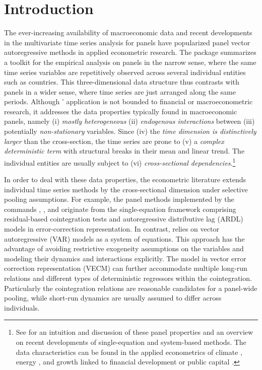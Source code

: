 
\section{Introduction} \label{sec:Intro}
The ever-increasing availability of macroeconomic data and recent developments in the multivariate time series analysis for panels have popularized panel vector autoregressive methods in applied econometric research. The  package summarizes a toolkit for the empirical analysis on panels in the narrow sense, where the same time series variables are repetitively observed across several individual entities such as countries. This three-dimensional data structure thus contrasts with panels in a wider sense, where time series are just arranged along the same periods. Although ' application is not bounded to financial or macroeconometric research, it addresses the data properties typically found in macroeconomic panels, namely (i) \textit{mostly heterogeneous} (ii) \textit{endogenous interactions} between (iii) potentially \textit{non-stationary} variables. Since (iv) the \textit{time dimension is distinctively larger} than the cross-section, the time series are prone to (v) a \textit{complex deterministic term} with structural breaks in their mean and linear trend. The individual entities are usually subject to (vi) \textit{cross-sectional dependencies}.\footnote{See \citet{Pedroni2019} for an intuition and discussion of these panel properties and an overview on recent developments of single-equation and system-based methods. The data characteristics can be found in the applied econometrics of climate \citep{Pretis2020}, energy \citep{SmythNarayan2015}, and growth linked to financial development \citep{ChristopoulosTsionas2004} or public capital \citep{EmptingHerwartz2021b}.}

In order to deal with these data properties, the econometric literature extends individual time series methods by the cross-sectional dimension under selective pooling assumptions. For example, the panel methods implemented by the  commands  \citep{StataCorp2019},  \citep{PersynWesterlund2008}, and  \citep{BlackburneFrank2007} originate from the single-equation framework comprising residual-based cointegration tests and autoregressive distributive lag (ARDL) models in error-correction representation. 
In contrast,  relies on vector autoregressive (VAR) models as a system of equations. This approach has the advantage of avoiding restrictive exogeneity assumptions on the variables and modeling their dynamics and interactions explicitly.
The model in vector error correction representation (VECM) can further accommodate multiple long-run relations and different types of deterministic regressors within the cointegration. Particularly the cointegration relations are reasonable candidates for a panel-wide pooling, while short-run dynamics are usually assumed to differ across individuals. 

